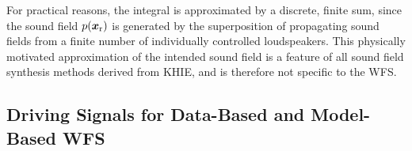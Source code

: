 For practical reasons, the integral is approximated by a discrete, finite sum,
since the sound field $p(\bm{x}_\mathrm{r})$ is generated by the superposition of propagating
sound fields from a finite number of individually controlled loudspeakers.
%
%
This physically motivated approximation of the intended sound field is
a feature of all sound field synthesis methods derived from KHIE, and
is therefore not specific to the WFS.
%



\subsection{Driving Signals for Data-Based and Model-Based WFS}

